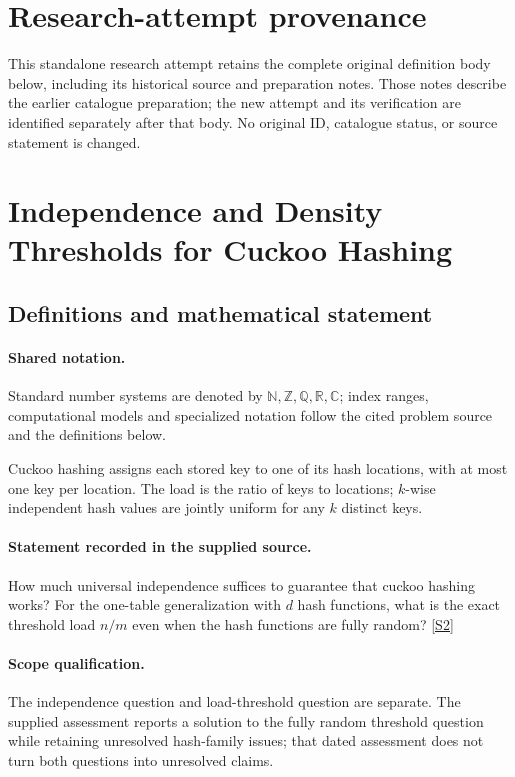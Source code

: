 \documentclass[11pt]{article}
\begin{document}
\section*{Research-attempt provenance}
This standalone research attempt retains the complete original definition body below,
including its historical source and preparation notes. Those notes describe the
earlier catalogue preparation; the new attempt and its verification are identified
separately after that body. No original ID, catalogue status, or source statement is changed.

\section{Independence and Density Thresholds for Cuckoo Hashing}\label{statement}

\subsection{Definitions and mathematical statement}

\paragraph{Shared notation.}Standard number systems are denoted by $\mathbb N,\mathbb Z,\mathbb Q,\mathbb R,\mathbb C$; index ranges, computational models and specialized notation follow the cited problem source and the definitions below.


Cuckoo hashing assigns each stored key to one of its hash locations, with at most one key per location. The load is the ratio of keys to locations; $k$-wise independent hash values are jointly uniform for any $k$ distinct keys.
\paragraph{Statement recorded in the supplied source.}
How much universal independence suffices to guarantee that cuckoo hashing works? For the one-table generalization with $d$ hash functions, what is the exact threshold load $n/m$ even when the hash functions are fully random? \href{https://doi.org/10.4171/owr/2009/23}{[S2]}
\paragraph{Scope qualification.}
The independence question and load-threshold question are separate. The supplied assessment reports a solution to the fully random threshold question while retaining unresolved hash-family issues; that dated assessment does not turn both questions into unresolved claims.
\end{document}
